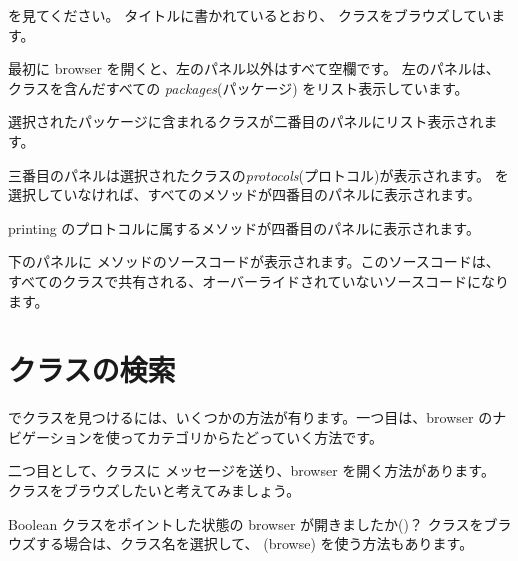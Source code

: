 \documentclass[a4paper,10pt,twoside]{book}
\begin{document}
 を見てください。
タイトルに書かれているとおり、 クラスをブラウズしています。

最初に browser を開くと、左のパネル以外はすべて空欄です。
左のパネルは、クラスを含んだすべての \emph{packages}(パッケージ) をリスト表示しています。

選択されたパッケージに含まれるクラスが二番目のパネルにリスト表示されます。

三番目のパネルは選択されたクラスの\emph{protocols}(プロトコル)が表示されます。
 を選択していなければ、すべてのメソッドが四番目のパネルに表示されます。

printing のプロトコルに属するメソッドが四番目のパネルに表示されます。

下のパネルに メソッドのソースコードが表示されます。このソースコードは、すべてのクラスで共有される、オーバーライドされていないソースコードになります。

\section{クラスの検索}

\pharo でクラスを見つけるには、いくつかの方法が有ります。一つ目は、browser のナビゲーションを使ってカテゴリからたどっていく方法です。

二つ目として、クラスに  メッセージを送り、browser を開く方法があります。 クラスをブラウズしたいと考えてみましょう。

Boolean クラスをポイントした状態の browser が開きましたか()？
クラスをブラウズする場合は、クラス名を選択して、  (browse) を使う方法もあります。
\end{document}
